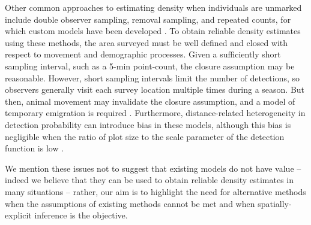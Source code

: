 Other common approaches to estimating density when individuals are
unmarked include double observer sampling, removal sampling, and
repeated counts, for which custom models have been developed
\citep{nichols_etal:2000, farnsworth_etal:2002, royle:2004biom,
  royle:2004abc, nichols_etal:2009,fiske_chandler:2011}. To
obtain reliable density estimates using these
methods, the area surveyed must be well defined and closed with
respect to movement and demographic processes. Given a sufficiently short
sampling interval, such as a 5-min point-count, the closure
assumption may be reasonable. However, short sampling intervals limit
the number of detections, so observers generally visit each survey
location multiple times during a season. But then, animal
movement may invalidate the closure assumption, and a model of
temporary emigration is required
\citep{kendall_etal:1997,chandler_etal:2011}. Furthermore,
distance-related heterogeneity in detection probability can introduce
bias in these models, although this bias is negligible when the
ratio of plot size to the scale parameter of the detection function is low
\citep{efford_dawson:2009}.

We mention these issues not to suggest that existing models do not
have value -- indeed we believe that they can be used to obtain
reliable density estimates in many situations -- rather, our aim is to
highlight the need for alternative methods when the assumptions of
existing methods cannot be met and when spatially-explicit inference
is the objective. %



